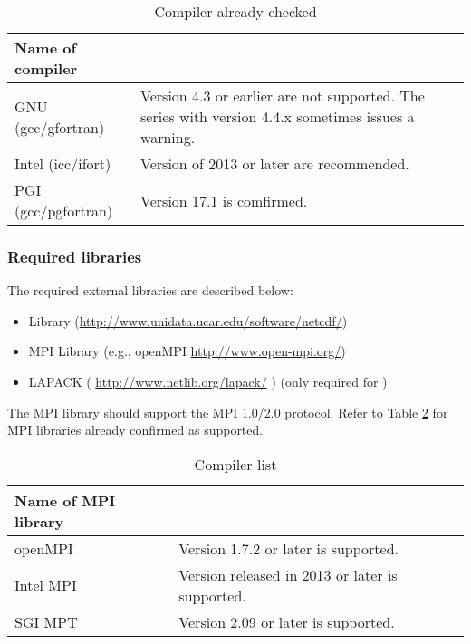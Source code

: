 \begin{table}[tb]
\begin{center}
\caption{Compiler already checked}
\begin{tabularx}{150mm}{|l|X|} \hline
 \rowcolor[gray]{0.9} Name of compiler &  \\ \hline
  GNU (gcc/gfortran)    & Version 4.3 or earlier are not supported. The series with version 4.4.x sometimes issues a warning. \\ \hline
  Intel (icc/ifort)     & Version of 2013 or later are recommended. \\ \hline
  PGI (gcc/pgfortran)   & Version 17.1 is comfirmed.       \\ \hline
\end{tabularx}
\label{tab:compatible_compiler}
\end{center}
\end{table}



\subsubsection{Required libraries}\label{sec:inst_env}

The required external libraries are described below:
\begin{itemize}
\item {\netcdf} Library (\url{http://www.unidata.ucar.edu/software/netcdf/})
\item MPI Library (e.g., openMPI \url{http://www.open-mpi.org/})
\item LAPACK ( \url{http://www.netlib.org/lapack/} ) (only required for \scalegm)
\end{itemize}


The MPI library should support the MPI 1.0/2.0 protocol.  Refer to Table \ref{tab:compatible_mpi} for MPI libraries already confirmed as supported.

\begin{table}[tb]
\begin{center}
\caption{Compiler list}
\begin{tabularx}{150mm}{|l|X|} \hline
 \rowcolor[gray]{0.9} Name of MPI library &  \\ \hline
  openMPI               & Version 1.7.2 or later is supported. \\ \hline
  Intel MPI             & Version released in 2013 or later is supported.\\ \hline
  SGI MPT               & Version 2.09 or later is supported. \\ \hline
\end{tabularx}
\label{tab:compatible_mpi}
\end{center}
\end{table}



